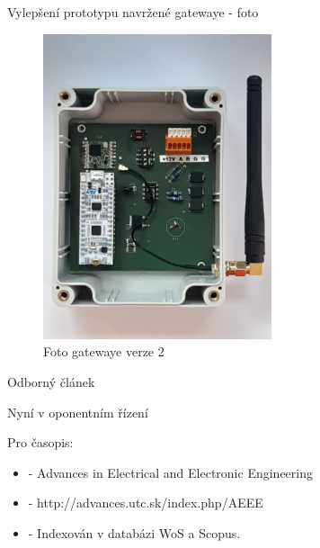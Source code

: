 \documentclass{beamer}
\begin{document}
\begin{frame}{Vylepšení prototypu navržené gatewaye - foto}
	\begin{figure}[!h]
		\centering
		\includegraphics[width=0.6\textwidth]{photo_minigatewayV2}
		\caption{Foto gatewaye verze 2}
		\label{fig:minigateway_fotoV2}
	\end{figure}
\end{frame}


\begin{frame}{Odborný článek}
	
	Nyní v oponentním řízení

	Pro časopis:
	\begin{itemize}
		\item 	- Advances in Electrical and Electronic Engineering
		\item 	- http://advances.utc.sk/index.php/AEEE
		\item 	- Indexován v databázi WoS a Scopus.
	\end{itemize}


\end{frame}
\end{document}
